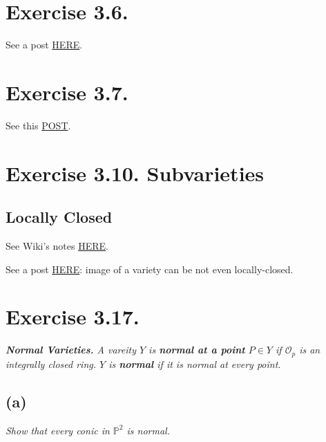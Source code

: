 \section{Exercise 3.6.}

See a post \href{https://math.stackexchange.com/questions/2120717/there-are-quasi-affine-varieties-which-are-not-affine#:~:text=I%20see%20this%20sentence%20in,(0%2C0)%7D.}{HERE}.

\section{Exercise 3.7.}

See this \href{https://math.stackexchange.com/questions/699433/exercise-3-7-hartshorne}{POST}.

\section{Exercise 3.10. \textbf{Subvarieties}}

\subsection{Locally Closed} 

See Wiki's notes \href{https://en.wikipedia.org/wiki/Locally_closed_subset}{HERE}. 

See a post \href{https://math.stackexchange.com/questions/341665/image-of-a-morphism-of-varieties}{HERE}: image of a variety can be not even locally-closed.

\section{Exercise 3.17.}
\textit{\textbf{Normal Varieties.} A vareity $Y$ is \textbf{normal at a point} $P\in Y$ if $\mathscr O_p$ is an integrally closed ring. $Y$ is \textbf{normal} if it is normal at every point.}

\subsection{(a)}\textit{Show that every conic in $\mathbb P^2$ is normal.}

